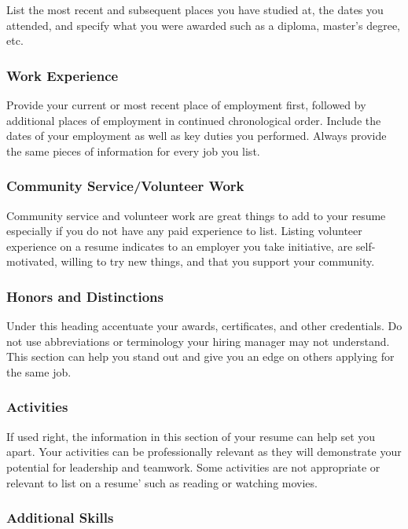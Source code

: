 List the most recent and subsequent places you have studied at, the dates you attended, and specify what you were awarded such as a diploma, master's degree, etc.

\subsubsection*{Work Experience}

Provide your current or most recent place of employment first, followed by additional places of employment in continued chronological order. Include the dates of your employment as well as key duties you performed.
Always provide the same pieces of information for every job you list.

\subsubsection*{Community Service/Volunteer Work}

Community service and volunteer work are great things to add to your resume especially if you do not have any paid experience to list. Listing volunteer experience on a resume indicates to an employer you take initiative, are self-motivated, willing to try new things, and that you support your community.

\subsubsection*{Honors and Distinctions}

Under this heading accentuate your awards, certificates, and other credentials. Do not use abbreviations or terminology your hiring manager may not understand. This section can help you stand out and give you an edge on others applying for the same job.

\subsubsection*{Activities}

If used right, the information in this section of your resume can help set you apart. Your activities can be professionally relevant as they will demonstrate your potential for leadership and teamwork. Some activities are not appropriate or relevant to list on a resume' such as reading or watching movies.

\subsubsection*{Additional Skills}

